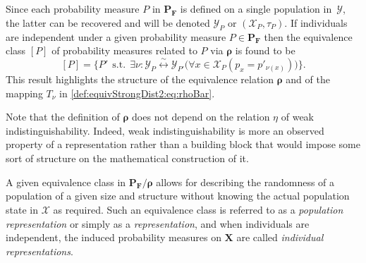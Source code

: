 \documentclass{aptpub}
\numberwithin{equation}{section}
\begin{document}
Since each probability measure $P$ in ${\mathbf{P}}_{\mathbf{F}}$ is defined on a single population in~${\boldsymbol{\mathcal{Y}}}$, the latter can be recovered and will be denoted ${\mathcal{Y}}_P$ or $({\mathcal{X}}_P,\tau_P)$. If individuals are independent under a given probability measure $P \in {\mathbf{P}}_{\mathbf{F}}$ then the equivalence class $[P]$ of probability measures related to $P$ via ${\boldsymbol{\rho}}$ is found to be
{\begin{equation*}{
[P] = \big\{ P' {\;\,\mbox{s.t.}\;\,} \exists \nu : {\mathcal{Y}}_P {\stackrel{\sim}{{\longleftrightarrow}}} {\mathcal{Y}}_{P'} \big( \forall x \in {\mathcal{X}}_P ( p_x = p'_{\nu(x)} )  \big) \big\}.
}\end{equation*}}
This result highlights the structure of the equivalence relation ${\boldsymbol{\rho}}$ and of the mapping $T_{\nu}$ in \eqref{def:equivStrongDist2:eq:rhoBar}.

Note that the definition of ${\boldsymbol{\rho}}$ does not depend on the relation $\eta$ of weak indistinguishability. Indeed, weak indistinguishability is more an observed property of a representation rather than a building block that would impose some sort of structure on the mathematical construction of it.

A given equivalence class in ${\mathbf{P}}_{\mathbf{F}}/{\boldsymbol{\rho}}$ allows for describing the randomness of a population of a given size and structure without knowing the actual population state in ${\boldsymbol{\mathcal{X}}}$ as required. Such an equivalence class is referred to as a \emph{population representation} or simply as a \emph{representation}, and when individuals are independent, the induced probability measures on ${\mathbf{X}}$ are called \emph{individual representations}.
\end{document}
